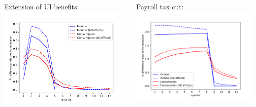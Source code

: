 \documentclass[pdflatex,aspectratio=169]{beamer}
\begin{document}
{\begin{frame}
\begin{columns}
                \begin{column}{0.50\textwidth}  	
                  Extension of UI benefits:
                  \includegraphics[width=1.2\linewidth]{Code/HA-Models/FromPandemicCode/Figures/recession_UI_relrecession} 
                \end{column}
                
                \begin{column}{0.50\textwidth}  
                  Payroll tax cut:	
                  \includegraphics[width=1.2\linewidth]{Code/HA-Models/FromPandemicCode/Figures/recession_taxcut_relrecession}
                \end{column}
              \end{columns}
              
            \end{frame}
            


          }{}
\end{document}
